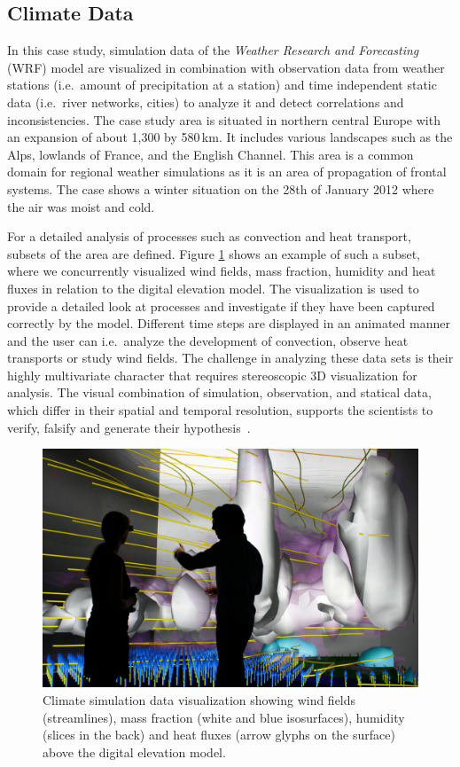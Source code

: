 \documentclass[twocolumn]{svjour3}          %
\begin{document}
\subsection{Climate Data}
\label{climate-data}

In this case study, simulation data of the \emph{Weather Research and Forecasting} (WRF) model are visualized in combination with observation data from weather stations (i.e.~amount of precipitation at a station) and time independent static data (i.e.~river networks, cities) to analyze it and detect correlations and inconsistencies. The case study area is situated in northern central Europe with an expansion of about 1,300 by 580\,km. It includes various landscapes such as the Alps, lowlands of France, and the English Channel. This area is a common domain for regional weather simulations as it is an area of propagation of frontal systems. The case shows a winter situation on the 28th of January 2012 where the air was moist and cold.

For a detailed analysis of processes such as convection and heat transport, subsets of the area are defined. Figure \ref{fig:wind} shows an example of such a subset, where we concurrently visualized wind fields, mass fraction, humidity and heat fluxes in relation to the digital elevation model. The visualization is used to provide a detailed look at processes and investigate if they have been captured correctly by the model. Different time steps are displayed in an animated manner and the user can i.e.~analyze the development of convection, observe heat transports or study wind fields. The challenge in analyzing these data sets is their highly multivariate character that requires stereoscopic 3D visualization for analysis. The visual combination of simulation, observation, and statical data, which differ in their spatial and temporal resolution, supports the scientists to verify, falsify and generate their hypothesis~\cite{helbig:eesenvirvis}.

\begin{figure}[htb]
  \includegraphics[width=\linewidth]{images/wind.jpg}
  \caption{Climate simulation data visualization showing wind fields (streamlines), mass fraction (white and blue isosurfaces), humidity (slices in the back) and heat fluxes (arrow glyphs on the surface) above the digital elevation model.}
\label{fig:wind}
\end{figure}
\end{document}
